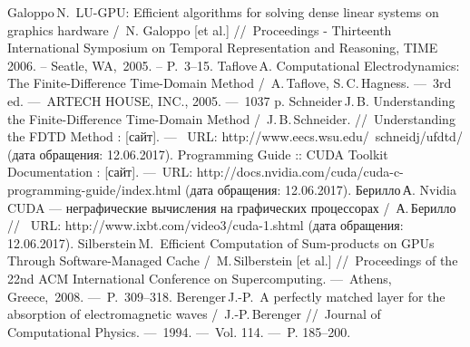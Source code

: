 {\def\section*#1{}
\begin{thebibliography}{99}
 Galoppo\,N.~LU-GPU: Efficient algorithms for solving dense linear systems on graphics hardware /~N. Galoppo [et al.] //~Proceedings - Thirteenth International Symposium on Temporal Representation and Reasoning, TIME 2006. -- Seatle, WA,~2005. -- P.~3--15.
 Taflove\,A. Computational Electrodynamics: The Finite-Difference Time-Domain Method /~A.\,Taflove, S.\,C.\,Hagness. ---~3rd ed. ---~ARTECH HOUSE, INC., 2005. ---~1037 p.
 Schneider\,J.\,B. Understanding the Finite-Difference Time-Domain Method /~J.\,B.\,Schneider. //~Understanding the FDTD Method : [сайт]. ---~ URL: http://www.eecs.wsu.edu/~schneidj/ufdtd/ (дата обращения: 12.06.2017).
 Programming Guide :: CUDA Toolkit Documentation : [сайт]. ---~URL: http://docs.nvidia.com/cuda/cuda-c-programming-guide/index.html (дата обращения: 12.06.2017).
 Берилло\,А. Nvidia CUDA --- неграфические вычисления на графических процессорах /~А.\,Берилло //~ URL: http://www.ixbt.com/video3/cuda-1.shtml  (дата обращения: 12.06.2017).
 Silberstein\,M.~Efficient Computation of Sum-products on GPUs Through
Software-Managed Cache /~M.\,Silberstein [et al.] //~Proceedings of the 22nd ACM International Conference on Supercomputing. ---~Athens, Greece,~2008. ---~P.~309--318.
 Berenger\,J.-P.~A perfectly matched layer for the absorption of electromagnetic waves /~J.-P.\,Berenger //~Journal of Computational Physics. ---~1994. ---~Vol. 114. ---~P. 185--200.
\end{thebibliography}
}
\clearpage
